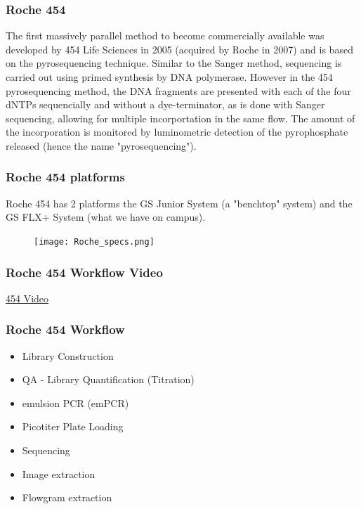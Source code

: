 \documentclass[pdf]{beamer}
\begin{document}
\begin{frame}
  \frametitle{Roche 454}
  The first massively parallel method to become commercially available was developed by 454 Life Sciences in 2005 (acquired by Roche in 2007) and is based on the pyrosequencing technique. Similar to the Sanger method, sequencing is carried out using primed synthesis by DNA polymerase. However in the 454 pyrosequencing method, the DNA fragments are presented with each of the four dNTPs sequencially and without a dye-terminator, as is done with Sanger sequencing, allowing for multiple incorportation in the same flow. The amount of the incorporation is monitored by luminometric detection of the pyrophosphate released (hence the name "pyrosequencing").
\end{frame}

\begin{frame}
  \frametitle{Roche 454 platforms}
  Roche 454 has 2 platforms the GS Junior System (a "benchtop" system) and the GS FLX+ System (what we have on campus).
  \begin{center}
    \begin{figure}
    \texttt{[image: Roche\_specs.png]}
  \end{figure}
  \end{center}
\end{frame}

\begin{frame}
  \frametitle{Roche 454 Workflow Video}
  \begin{center}
  \href{http://www.youtube.com/watch?feature=player_detailpage&v=bFNjxKHP8Jc}{454 Video}
  \end{center}  
\end{frame}

\begin{frame}
  \frametitle{Roche 454 Workflow}
  \begin{itemize}
  \item Library Construction
  \item QA - Library Quantification (Titration)
  \item emulsion PCR (emPCR)
  \item Picotiter Plate Loading
  \item Sequencing
  \item Image extraction
  \item Flowgram extraction
  \end{itemize}
\end{frame}
\end{document}
